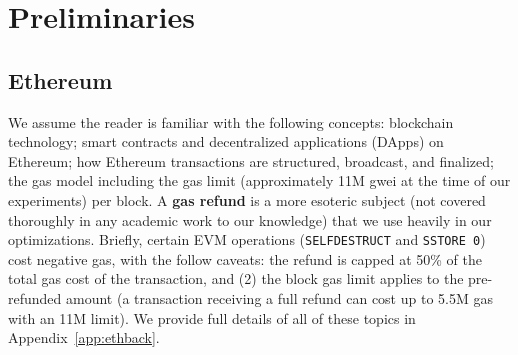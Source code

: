 


\section{Preliminaries}

\subsection{Ethereum}

We assume the reader is familiar with the following concepts: blockchain technology; smart contracts and decentralized applications (DApps) on Ethereum; how Ethereum transactions are structured, broadcast, and finalized; the gas model including the gas limit (approximately 11M gwei at the time of our experiments) per block. A \textbf{gas refund} is a more esoteric subject (not covered thoroughly in any academic work to our knowledge) that we use heavily in our optimizations. Briefly, certain EVM operations (\texttt{SELFDESTRUCT} and \texttt{SSTORE 0}) cost negative gas, with the follow caveats: the refund is capped at 50\% of the total gas cost of the transaction, and (2) the block gas limit applies to the pre-refunded amount (\ie a transaction receiving a full refund can cost up to 5.5M gas with an 11M limit). We provide full details of all of these topics in Appendix~\ref{app:ethback}. 

